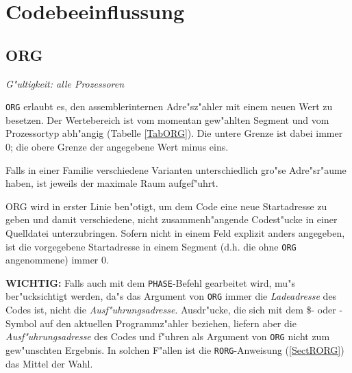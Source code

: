 \documentclass[12pt,a4paper,twoside]{report}
\makeatletter
\newcommand{\tty}[1]{{\tt #1}}
\newcommand{\ttindex}[1]{\index{#1@{\tt #1}}}
\makeatother
\begin{document}

\section{Codebeeinflussung}


\subsection{ORG}
\label{SectORG}\ttindex{ORG}

{\em G"ultigkeit: alle Prozessoren}

\tty{ORG} erlaubt es, den assemblerinternen Adre"sz"ahler mit einem neuen
Wert zu besetzen.  Der Wertebereich ist vom momentan gew"ahlten Segment
und vom Prozessortyp abh"angig (Tabelle \ref{TabORG}).
Die untere Grenze ist dabei immer 0; die obere Grenze der angegebene Wert
minus eins.
\par
Falls in einer Familie verschiedene Varianten unterschiedlich
gro"se Adre"sr"aume haben, ist jeweils der maximale Raum aufgef"uhrt.
\par
ORG wird in erster Linie ben"otigt, um dem Code eine neue Startadresse
zu geben und damit verschiedene, nicht zusammenh"angende Codest"ucke in
einer Quelldatei unterzubringen.  Sofern nicht in einem Feld explizit anders
angegeben, ist die vorgegebene Startadresse in einem Segment (d.h. die ohne
{\tt ORG} angenommene) immer 0.
\par
{\bf WICHTIG:} Falls auch mit dem \tty{PHASE}-Befehl gearbeitet
wird, mu"s ber"ucksichtigt werden, da"s das Argument von \tty{ORG}
immer die {\em Ladeadresse} des Codes ist, nicht die {\em
Ausf"uhrungsadresse}.  Ausdr"ucke, die sich mit dem \$- oder
\*-Symbol auf den aktuellen Programmz"ahler beziehen, liefern
aber die {\em Ausf"uhrungsadresse} des Codes und f"uhren als
Argument von \tty{ORG} nicht zum gew"unschten Ergebnis.  In
solchen F"allen ist die \tty{RORG}-Anweisung (\ref{SectRORG}) das
Mittel der Wahl.
\end{document}

